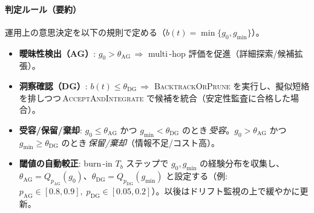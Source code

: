 \documentclass[ja=standard,xelatex]{bxjsarticle}
\begin{document}
\paragraph{判定ルール（要約）}
運用上の意思決定を以下の規則で定める（$b(t){=}\min\{g_0, g_{\min}\}$）。
\begin{itemize}
  \item \textbf{曖昧性検出（AG）}: $g_0 > \theta_{\mathrm{AG}}$\;\,$\Rightarrow$\; multi\,\mbox{-}hop 評価を促進（詳細探索/候補拡張）。
  \item \textbf{洞察確認（DG）}: $b(t) \le \theta_{\mathrm{DG}}$\;\,$\Rightarrow$\; \textsc{BacktrackOrPrune} を実行し、擬似短絡を排しつつ\,\textsc{AcceptAndIntegrate} で候補を統合（安定性監査に合格した場合）。
  \item \textbf{受容/保留/棄却}: $g_0 \le \theta_{\mathrm{AG}}$ かつ $g_{\min} < \theta_{\mathrm{DG}}$ のとき\,\emph{受容}。$g_0 > \theta_{\mathrm{AG}}$ かつ $g_{\min} \ge \theta_{\mathrm{DG}}$ のとき\,\emph{保留/棄却}（情報不足/コスト高）。
  \item \textbf{閾値の自動較正}: burn\,\mbox{-}in $T_b$ ステップで $g_0, g_{\min}$ の経験分布を収集し、$\theta_{\mathrm{AG}}{=}Q_{p_{\mathrm{AG}}}(g_0)$、$\theta_{\mathrm{DG}}{=}Q_{p_{\mathrm{DG}}}(g_{\min})$ と設定する（例: $p_{\mathrm{AG}}\in[0.8,0.9],\; p_{\mathrm{DG}}\in[0.05,0.2]$）。以後はドリフト監視の上で緩やかに更新。
\end{itemize}
\end{document}
